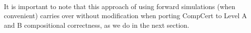 


\paragraph*{}

  It is important to note that this approach of using forward simulations (when
convenient) carries over without modification when porting CompCert to Level A and B compositional
correctness, as we do in the next section.



